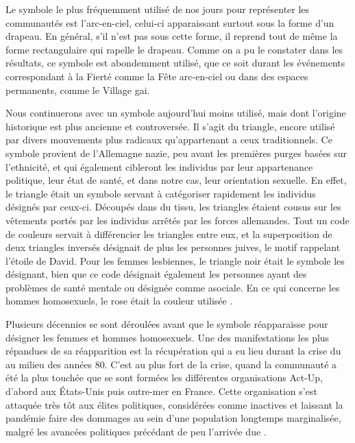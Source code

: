Le symbole le plus fréquemment utilisé de nos jours pour représenter les communautés \lgbt{} est l'arc-en-ciel, celui-ci apparaissant surtout sous la forme d'un drapeau.
En général, s'il n'est pas sous cette forme, il reprend tout de même la forme rectangulaire qui rapelle le drapeau.
Comme on a pu le constater dans les résultats, ce symbole est abondemment utilisé, que ce soit durant les événements correspondant à la Fierté comme la Fête arc-en-ciel ou dans des espaces permanents, comme le Village gai.

Nous continuerons avec un symbole aujourd'hui moins utilisé, mais dont l'origine historique est plus ancienne et controversée.
Il s'agit du triangle, encore utilisé par divers mouvements plus radicaux qu'appartenant a ceux traditionnels.
Ce symbole provient de l'Allemagne nazie, peu avant les premières purges basées sur l'ethnicité, et qui également cibleront les individus par leur appartenance politique, leur état de santé, et dans notre cas, leur orientation sexuelle.
En effet, le triangle était un symbole servant à catégoriser rapidement les individus désignés par ceux-ci.
Découpés dans du tissu, les triangles étaient cousus sur les vêtements portés par les individus arrêtés par les forces allemandes.
Tout un code de couleurs servait à différencier les triangles entre eux, et la superposition de deux triangles inversés désignait de plus les personnes juives, le motif rappelant l'étoile de David.
Pour les femmes lesbiennes, le triangle noir était le symbole les désignant, bien que ce code désignait également les personnes ayant des problèmes de santé mentale ou désignée comme asociale.
En ce qui concerne les hommes homosexuels, le rose était la couleur utilisée \missref{}.

Plusieurs décennies se sont déroulées avant que le symbole réapparaisse pour désigner les femmes et hommes homosexuels.
Une des manifestations les plus répandues de sa réapparition est la récupération qui a eu lieu durant la crise du \vih{} au milieu des années 80.
C'est au plus fort de la crise, quand la communauté \lgbt{} a été la plus touchée que se sont formées les différentes organisations Act-Up, d'abord aux États-Unis puis outre-mer en France.
Cette organisation s'est attaquée très tôt aux élites politiques, considérées comme inactives et laissant la pandémie faire des dommages au sein d'une population longtemps marginalisée, malgré les avancées politiques précédant de peu l'arrivée due \vih{}.

